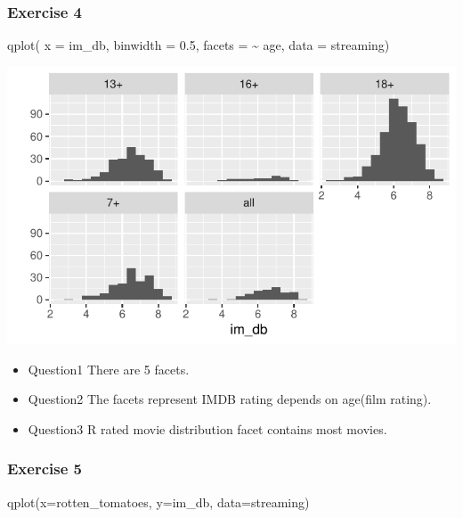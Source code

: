 \documentclass[
  11pt,
]{article}
\newenvironment{Shaded}{\begin{snugshade}}{\end{snugshade}}
\newcommand{\AttributeTok}[1]{\textcolor[rgb]{0.77,0.63,0.00}{#1}}
\newcommand{\FloatTok}[1]{\textcolor[rgb]{0.00,0.00,0.81}{#1}}
\newcommand{\FunctionTok}[1]{\textcolor[rgb]{0.00,0.00,0.00}{#1}}
\newcommand{\NormalTok}[1]{#1}
\newcommand{\SpecialCharTok}[1]{\textcolor[rgb]{0.00,0.00,0.00}{#1}}
\begin{document}
\hypertarget{exercise-4}{%
\subsubsection{Exercise 4}\label{exercise-4}}

\begin{Shaded}
\begin{Highlighting}[]
\FunctionTok{qplot}\NormalTok{(}
  \AttributeTok{x =}\NormalTok{ im\_db, }
  \AttributeTok{binwidth =} \FloatTok{0.5}\NormalTok{, }
  \AttributeTok{facets =} \SpecialCharTok{\textasciitilde{}}\NormalTok{ age,}
  \AttributeTok{data =}\NormalTok{ streaming)}
\end{Highlighting}
\end{Shaded}

\begin{center}\includegraphics[width=0.8\linewidth]{lab02_files/figure-latex/unnamed-chunk-3-1} \end{center}

\begin{itemize}
\item
  Question1 There are 5 facets.
\item
  Question2 The facets represent IMDB rating depends on age(film
  rating).
\item
  Question3 R rated movie distribution facet contains most movies.
\end{itemize}

\hypertarget{exercise-5}{%
\subsubsection{Exercise 5}\label{exercise-5}}

\begin{Shaded}
\begin{Highlighting}[]
\FunctionTok{qplot}\NormalTok{(}\AttributeTok{x=}\NormalTok{rotten\_tomatoes, }\AttributeTok{y=}\NormalTok{im\_db, }\AttributeTok{data=}\NormalTok{streaming)}
\end{Highlighting}
\end{Shaded}
\end{document}
